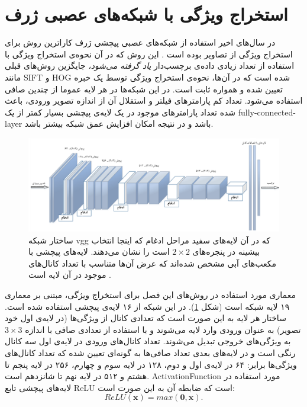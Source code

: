 \section{استخراج ویژگی با شبکه‌های عصبی ژرف}\label{cnns}
 در سال‌های اخیر استفاده از شبکه‌های عصبی پیچشی ژرف کاراترین روش برای استخراج ویژگی از تصاویر بوده است \cite{Oquab2014}. این روش که در آن نحوه‌ی استخراج ویژگی با استفاده از تعداد زیادی داده‌ی برچسب‌دار
\textit{یاد گرفته می‌شود،}
جایگزین روش‌های قبلی مانند SIFT و HOG شده است که در آن‌ها، نحوه‌ی استخراج ویژگی توسط یک خبره تعیین شده و همواره ثابت است.
 در این شبکه‌ها در هر لایه عموما از چندین صافی استفاده می‌شود. تعداد کم پارامترهای فیلتر و استقلال آن از اندازه تصویر ورودی، باعث شده تعداد پارامتر‌های موجود در یک لایه‌ی پیچشی بسیار کمتر از یک \gls{fully-connected-layer} باشد و در نتیجه امکان افزایش عمق شبکه بیشتر باشد.
\begin{figure}[!t]
\centering
\includegraphics[width=1.1\linewidth]{images/vgg}
\caption[ساختار شبکه استخراج ویژگی]{
ساختار شبکه vgg که در آن لایه‌های سفید مراحل ادغام که اینجا انتخاب بیشینه در پنجره‌های $2 \times 2$ است را نشان می‌دهند.
لایه‌های پیچشی با مکعب‌های آبی مشخص شده‌اند که عرض آن‌ها متناسب با تعداد کانال‌های موجود در آن لایه است \cite{el2016face}.
}
\label{fig:vgg}
\end{figure}
معماری مورد استفاده در روش‌های این فصل برای استخراج ویژگی، مبتنی بر معماری ۱۹ لایه شبکه  \cite{vgg} است (شکل \ref{fig:vgg}). در این شبکه از ۱۶ لایه‌ی پیچشی استفاده شده است. ساختار هر لایه به این صورت است که تعدادی کانال از ویژگی‌ها (در لایه‌ی اول  خود تصویر) به عنوان ورودی وارد لایه می‌شوند و با استفاده از تعدادی صافی با اندازه $3 \times 3$ به ویژگی‌های خروجی تبدیل می‌شوند. تعداد کانال‌های ورودی در لایه‌ی اول سه کانال رنگی  است و در لایه‌های بعدی تعداد صافی‌ها به گونه‌ای تعیین شده که تعداد کانال‌های ویژگی‌ها برابر: ۶۴ در لایه‌ی اول و دوم، ۱۲۸ در لایه‌ سوم و چهارم، ۲۵۶ در لایه پنجم تا هشتم و ۵۱۲ در لایه نهم تا شانزدهم است. \gls{ActivationFunction} مورد استفاده در لایه‌های پیچشی تابع \gls{ReLU} است که ضابطه آن به این صورت است:
\begin{equation}
ReLU(\mathbf{x}) = max(\mathbf{0,x}).
\end{equation}

